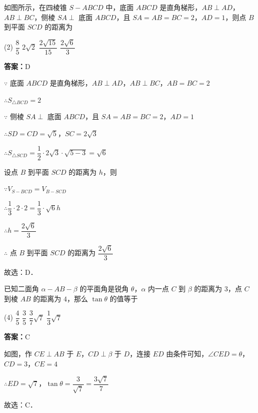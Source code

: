 \begin{example}[\bkstar{2}{5}]
如图所示，在四棱锥 $S-ABCD$ 中，底面 $ABCD$ 是直角梯形，$AB\perp AD$，$AB\perp BC$，侧棱 $SA\perp$ 底面 $ABCD$，且 $SA=AB=BC=2$，$AD=1$，则点 $B$ 到平面 $SCD$ 的距离为
\begin{tasks}(2)
    \task $\dfrac{8}{5}$
    \task $2\sqrt{2}$
    \task $\dfrac{2\sqrt{15}}{15}$
    \task $\dfrac{2\sqrt{6}}{3}$
\end{tasks}
\end{example}
\begin{solution}
\textbf{答案：}D

$\because$ 底面 $ABCD$ 是直角梯形，$AB\perp AD$，$AB\perp BC$，$AB=BC=2$

$\therefore S_{\triangle BCD}=2$

$\because$ 侧棱 $SA\perp$ 底面 $ABCD$，且 $SA=AB=BC=2$，$AD=1$

$\therefore SD=CD=\sqrt{5}$，$SC=2\sqrt{3}$

$\therefore S_{\triangle SCD}=\dfrac{1}{2}\cdot 2\sqrt{3}\cdot\sqrt{5-3}=\sqrt{6}$

设点 $B$ 到平面 $SCD$ 的距离为 $h$，则

$\because V_{S-BCD}=V_{B-SCD}$

$\therefore \dfrac{1}{3}\cdot 2\cdot 2=\dfrac{1}{3}\cdot\sqrt{6}h$

$\therefore h=\dfrac{2\sqrt{6}}{3}$

$\therefore$ 点 $B$ 到平面 $SCD$ 的距离为 $\dfrac{2\sqrt{6}}{3}$

故选：D．
\end{solution}

\vspace{2em}


\begin{example}[\bkstar{2}{5}]
已知二面角 $\alpha-AB-\beta$ 的平面角是锐角 $\theta$，$\alpha$ 内一点 $C$ 到 $\beta$ 的距离为 $3$，点 $C$ 到棱 $AB$ 的距离为 $4$，那么 $\tan\theta$ 的值等于
\begin{tasks}(4)
    \task $\dfrac{4}{5}$
    \task $\dfrac{3}{5}$
    \task $\dfrac{3}{7}\sqrt{7}$
    \task $\dfrac{1}{3}\sqrt{7}$
\end{tasks}
\end{example}
\begin{solution}
\textbf{答案：}C

如图，作 $CE\perp AB$ 于 $E$，$CD\perp\beta$ 于 $D$，连接 $ED$
由条件可知，$\angle CED=\theta$，$CD=3$，$CE=4$

$\therefore ED=\sqrt{7}$，$\tan\theta=\dfrac{3}{\sqrt{7}}=\dfrac{3\sqrt{7}}{7}$

故选：C．
\end{solution}

